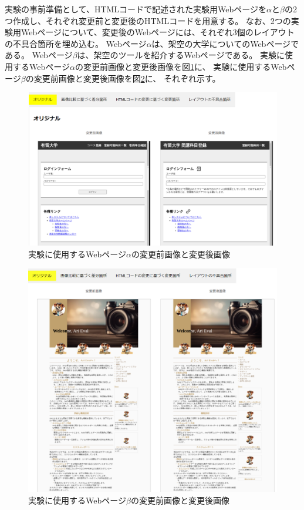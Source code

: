 実験の事前準備として、HTMLコードで記述された実験用Webページを$\alpha$と$\beta$の2つ作成し、それぞれ変更前と変更後のHTMLコードを用意する。
なお、2つの実験用Webページについて、変更後のWebページには、それぞれ3個のレイアウトの不具合箇所を埋め込む。
Webページ$\alpha$は、架空の大学についてのWebページである。
Webページ$\beta$は、架空のツールを紹介するWebページである。
実験に使用するWebページ$\alpha$の変更前画像と変更後画像を図\ref{fig:test1}に、
実験に使用するWebページ$\beta$の変更前画像と変更後画像を図\ref{fig:test2}に、
それぞれ示す。
\begin{figure}[tp]
    \centering
    \includegraphics[width=1.0\textwidth]{image/5/new_original.png}
    \caption{実験に使用するWebページ$\alpha$の変更前画像と変更後画像}
    \label{fig:test1}
\end{figure}
\begin{figure}[tp]
    \centering
    \includegraphics[width=1.0\textwidth]{image/6/test_beta.png}
    \caption{実験に使用するWebページ$\beta$の変更前画像と変更後画像}
    \label{fig:test2}
\end{figure}
